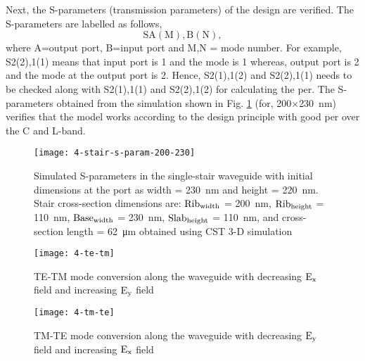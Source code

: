 \documentclass[../report.tex]{subfiles}
\begin{document}
\noindent Next, the S-parameters (transmission parameters) of the design are verified. The S-parameters are labelled as follows,
\begin{equation}\label{eq:s_parameter_label}
\mathrm{SA(M),B(N)},
\end{equation}
where A=output port, B=input port and M,N = mode number. For example, S2(2),1(1) means that input port is 1 and the mode is 1 whereas, output port is 2 and the mode at the output port is 2. Hence, S2(1),1(2) and S2(2),1(1) needs to be checked along with S2(1),1(1) and S2(2),1(2) for calculating the \gls{per}. The S-parameters obtained from the simulation shown in Fig. \ref{fig:4_stair_s_param_200_230} (for, 200$\times$\SI{230}{\nano \meter}) verifies that the model works according to the design principle with good \gls{per} over the C and L-band. 


\begin{figure}[H] %
	\centering
	\texttt{[image: 4-stair-s-param-200-230]}
	\caption{Simulated S-parameters in the single-stair waveguide with initial dimensions at the port as width = \SI{230}{\nano \meter} and height = \SI{220}{\nano \meter}. Stair cross-section dimensions are: $\mathrm{Rib_{width}}$ = \SI{200}{\nano \meter}, $\mathrm{Rib_{height}}$ = \SI{110}{\nano \meter}, $\mathrm{Base_{width}}$ = \SI{230}{\nano \meter}, $\mathrm{Slab_{height}}$ = \SI{110}{\nano \meter}, and cross-section length = \SI{62}{\micro\meter} obtained using CST 3-D simulation}
	\label{fig:4_stair_s_param_200_230}
\end{figure}

\begin{figure}[H] %
	\centering
	\texttt{[image: 4-te-tm]}
	\caption{TE-TM mode conversion along the waveguide with decreasing $\mathrm{E_{x}}$ field and increasing $\mathrm{E_{y}}$ field} 
	\label{fig:4_te_tm}
\end{figure}

\begin{figure}[H] %
	\centering
	\texttt{[image: 4-tm-te]}
	\caption{TM-TE mode conversion along the waveguide with decreasing $\mathrm{E_{y}}$ field and increasing $\mathrm{E_{x}}$ field}
	\label{fig:4_tm_te}
\end{figure}
\end{document}
